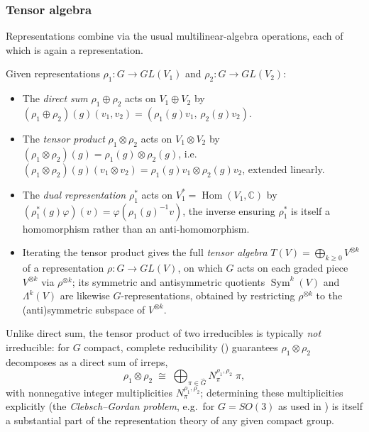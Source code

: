 \documentclass[mathematics,review,submit,moreauthors]{Definitions/mdpi}
\begin{document}
\subsubsection{Tensor algebra}
\label{subsubsec:tensor-algebra}

Representations combine via the usual multilinear-algebra operations, each
of which is again a representation.

\begin{Definition}
\label{def:tensor-operations}
Given representations $\rho_1 : G \to GL(V_1)$ and $\rho_2 : G \to GL(V_2)$:
\begin{itemize}
    \item The \emph{direct sum} $\rho_1 \oplus \rho_2$ acts on
    $V_1 \oplus V_2$ by $(\rho_1 \oplus \rho_2)(g)(v_1,v_2) =
    (\rho_1(g)v_1,\, \rho_2(g)v_2)$.
    \item The \emph{tensor product} $\rho_1 \otimes \rho_2$ acts on
    $V_1 \otimes V_2$ by
    $(\rho_1 \otimes \rho_2)(g) = \rho_1(g) \otimes \rho_2(g)$, i.e.\
    $(\rho_1\otimes\rho_2)(g)(v_1 \otimes v_2) = \rho_1(g)v_1 \otimes \rho_2(g)v_2$,
    extended linearly.
    \item The \emph{dual representation} $\rho_1^*$ acts on
    $V_1^* = \operatorname{Hom}(V_1,\mathbb{C})$ by
    $(\rho_1^*(g)\varphi)(v) = \varphi(\rho_1(g)^{-1} v)$, the inverse
    ensuring $\rho_1^*$ is itself a homomorphism rather than an
    anti-homomorphism.
    \item Iterating the tensor product gives the full \emph{tensor algebra}
    $T(V) = \bigoplus_{k \geq 0} V^{\otimes k}$ of a representation
    $\rho: G \to GL(V)$, on which $G$ acts on each graded piece
    $V^{\otimes k}$ via $\rho^{\otimes k}$; its symmetric and antisymmetric
    quotients $\operatorname{Sym}^k(V)$ and $\Lambda^k(V)$ are likewise
    $G$-representations, obtained by restricting $\rho^{\otimes k}$ to the
    (anti)symmetric subspace of $V^{\otimes k}$.
\end{itemize}
\end{Definition}

Unlike direct sum, the tensor product of two irreducibles is typically
\emph{not} irreducible: for $G$ compact, complete reducibility
() guarantees $\rho_1 \otimes \rho_2$ decomposes
as a direct sum of irreps,
\[
    \rho_1 \otimes \rho_2 \;\cong\; \bigoplus_{\pi \in \widehat{G}} N_{\pi}^{\rho_1,\rho_2}\; \pi,
\]
with nonnegative integer multiplicities $N_\pi^{\rho_1,\rho_2}$; determining
these multiplicities explicitly (the \emph{Clebsch--Gordan problem}, e.g.\
for $G = SO(3)$ as used in \citep{kondor2018p3icml}) is itself a substantial
part of the representation theory of any given compact group.
\end{document}
